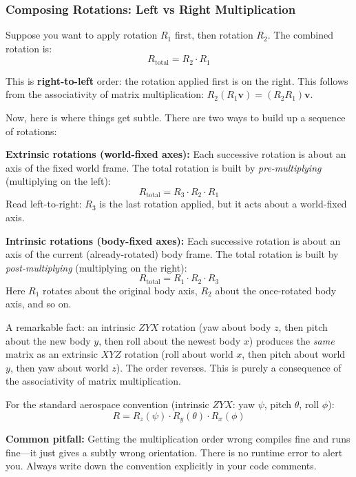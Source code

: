 \subsubsection{Composing Rotations: Left vs Right Multiplication}

Suppose you want to apply rotation $R_1$ first, then rotation $R_2$. The combined rotation is:
\begin{equation}
R_{\text{total}} = R_2 \cdot R_1
\end{equation}

This is \textbf{right-to-left} order: the rotation applied first is on the right. This follows from the associativity of matrix multiplication: $R_2 (R_1 \mathbf{v}) = (R_2 R_1) \mathbf{v}$.

Now, here is where things get subtle. There are two ways to build up a sequence of rotations:

\textbf{Extrinsic rotations (world-fixed axes):} Each successive rotation is about an axis of the fixed world frame. The total rotation is built by \textit{pre-multiplying} (multiplying on the left):
\[
R_{\text{total}} = R_3 \cdot R_2 \cdot R_1
\]
Read left-to-right: $R_3$ is the last rotation applied, but it acts about a world-fixed axis.

\textbf{Intrinsic rotations (body-fixed axes):} Each successive rotation is about an axis of the current (already-rotated) body frame. The total rotation is built by \textit{post-multiplying} (multiplying on the right):
\[
R_{\text{total}} = R_1 \cdot R_2 \cdot R_3
\]
Here $R_1$ rotates about the original body axis, $R_2$ about the once-rotated body axis, and so on.

A remarkable fact: an intrinsic $ZYX$ rotation (yaw about body $z$, then pitch about the new body $y$, then roll about the newest body $x$) produces the \textit{same} matrix as an extrinsic $XYZ$ rotation (roll about world $x$, then pitch about world $y$, then yaw about world $z$). The order reverses. This is purely a consequence of the associativity of matrix multiplication.

For the standard aerospace convention (intrinsic $ZYX$: yaw $\psi$, pitch $\theta$, roll $\phi$):
\begin{equation}
R = R_z(\psi) \cdot R_y(\theta) \cdot R_x(\phi)
\end{equation}

\textbf{Common pitfall:} Getting the multiplication order wrong compiles fine and runs fine---it just gives a subtly wrong orientation. There is no runtime error to alert you. Always write down the convention explicitly in your code comments.

